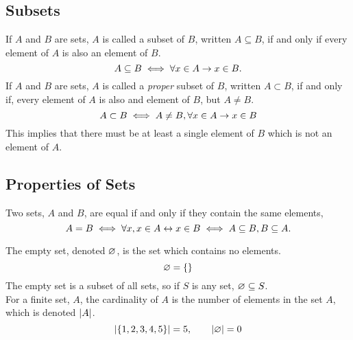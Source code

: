 \documentclass{report}
\begin{document}
\subsection*{Subsets}
If $A$ and $B$ are sets, $A$ is called a subset of $B$, written $A\subseteq B$, if and only if every element of $A$ is also an element of $B$.
$$
	A\subseteq B \iff \forall x\in A\rightarrow x\in B.
$$
If $A$ and $B$ are sets, $A$ is called a \textit{proper} subset of $B$, written $A\subset B$, if and only if, every element of $A$ is also and element of $B$, but $A\neq B$.
$$
	A\subset B \iff A\neq B, \forall x\in A \rightarrow x\in B
$$
This implies that there must be at least a single element of $B$ which is not an element of $A$.

\subsection*{Properties of Sets}
Two sets, $A$ and $B$, are equal if and only if they contain the same elements,
$$
	A = B \iff \forall x, x\in A \leftrightarrow x\in B \iff A\subseteq B, B\subseteq A.
$$

The empty set, denoted $\varnothing$, is the set which contains no elements.
$$
	\varnothing = \left\lbrace  \right\rbrace
$$
The empty set is a subset of all sets, so if $S$ is any set, $\varnothing \subseteq S$. \\

For a finite set, $A$, the cardinality of $A$ is the number of elements in the set $A$, which is denoted $\left| A \right|$.
$$
	\left| \left\lbrace 1,2,3,4,5 \right\rbrace \right| = 5,\qquad \left| \varnothing \right| = 0
$$

\end{document}
